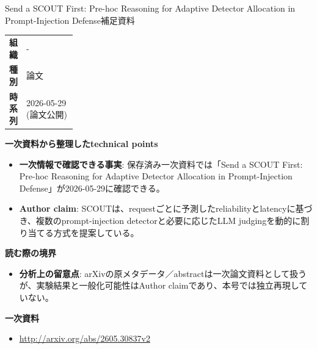 \begin{technicalnote}{Send a SCOUT First: Pre-hoc Reasoning for Adaptive Detector Allocation in Prompt-Injection Defense}{補足資料}
\begingroup
\begin{tabularx}{\linewidth}{@{}>{\bfseries}p{0.22\linewidth}X@{}}
組織 & - \\
種別 & 論文 \\
時系列 & 2026-05-29 (論文公開) \\
\end{tabularx}
\smallskip
{\bfseries 一次資料から整理したtechnical points}
\begin{itemize}[leftmargin=1.5em,itemsep=0.35em]
\item \textbf{一次情報で確認できる事実}: 保存済み一次資料では「Send a SCOUT First: Pre-hoc Reasoning for Adaptive Detector Allocation in Prompt-Injection Defense」が2026-05-29に確認できる。
\item \textbf{Author claim}: SCOUTは、requestごとに予測したreliabilityとlatencyに基づき、複数のprompt-injection detectorと必要に応じたLLM judgingを動的に割り当てる方式を提案している。
\end{itemize}
{\bfseries 読む際の境界}
\begin{itemize}[leftmargin=1.5em,itemsep=0.35em]
\item \textbf{分析上の留意点}: arXivの原メタデータ／abstractは一次論文資料として扱うが、実験結果と一般化可能性はAuthor claimであり、本号では独立再現していない。
\end{itemize}
\begin{samepage}
{\bfseries 一次資料}
\begingroup\sloppy
\begin{itemize}[leftmargin=1.5em,itemsep=0.25em]
\item {\scriptsize\url{http://arxiv.org/abs/2605.30837v2}}
\end{itemize}
\endgroup
\end{samepage}
\endgroup
\end{technicalnote}
\medskip
